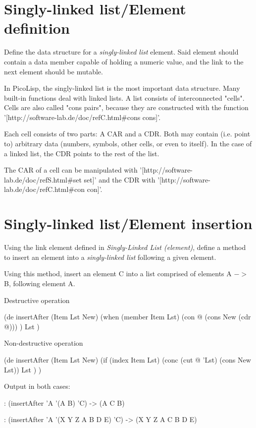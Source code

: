 \pagebreak{}
\section*{Singly-linked list/Element definition}

Define the data structure for a \emph{singly-linked list} element.
Said element should contain a data member capable of holding a numeric
value, and the link to the next element should be mutable.

\begin{wideverbatim}

In PicoLisp, the singly-linked list is the most important data structure. Many
built-in functions deal with linked lists. A list consists of interconnected
"cells". Cells are also called "cons pairs", because they are constructed with
the function '[http://software-lab.de/doc/refC.html#cons cons]'.

Each cell consists of two parts: A CAR and a CDR. Both may contain (i.e. point
to) arbitrary data (numbers, symbols, other cells, or even to itself). In the
case of a linked list, the CDR points to the rest of the list.

The CAR of a cell can be manipulated with
'[http://software-lab.de/doc/refS.html#set set]'
and the CDR with '[http://software-lab.de/doc/refC.html#con con]'.

\end{wideverbatim}

\pagebreak{}
\section*{Singly-linked list/Element insertion}

Using the link element defined in \emph{Singly-Linked List (element)},
define a method to insert an element into a \emph{singly-linked list}
following a given element.

Using this method, insert an element C into a list comprised of
elements A $->$ B, following element A.

\begin{wideverbatim}

Destructive operation

(de insertAfter (Item Lst New)
   (when (member Item Lst)
      (con @ (cons New (cdr @))) )
   Lst )

Non-destructive operation

(de insertAfter (Item Lst New)
   (if (index Item Lst)
      (conc (cut @ 'Lst) (cons New Lst))
      Lst ) )

Output in both cases:

: (insertAfter 'A '(A B) 'C)
-> (A C B)

: (insertAfter 'A '(X Y Z A B D E) 'C)
-> (X Y Z A C B D E)

\end{wideverbatim}

